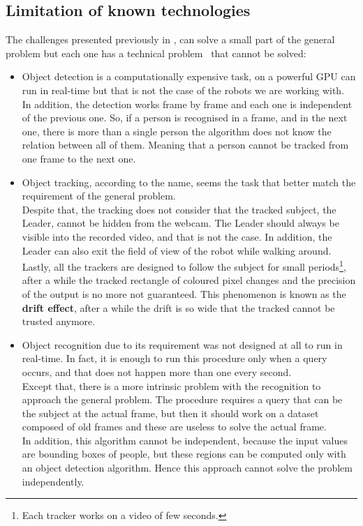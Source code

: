 \subsection{Limitation of known technologies}
The challenges presented previously in , can solve a small part of the general problem but each one has a technical problem~ that cannot be solved:
\begin{itemize}
	\item Object detection is a computationally expensive task, on a powerful GPU can run in real-time but that is not the case of the robots we are working with.\\
	In addition, the detection works frame by frame and each one is independent of the previous one. So, if a person is recognised in a frame, and in the next one, there is more than a single person the algorithm does not know the relation between all of them. Meaning that a person cannot be tracked from one frame to the next one.

	\item Object tracking, according to the name, seems the task that better match the requirement of the general problem.\\
	Despite that, the tracking does not consider that the tracked subject, the Leader, cannot be hidden from the webcam. The Leader should always be visible into the recorded video, and that is not the case. In addition, the Leader can also exit the field of view of the robot while walking around.\\
	Lastly, all the trackers are designed to follow the subject for small periods\footnote{Each tracker works on a video of few seconds.}, after a while the tracked rectangle of coloured pixel changes and the precision of the output is no more not guaranteed. This phenomenon is known as the \textbf{drift effect}, after a while the drift is so wide that the tracked cannot be trusted anymore.

	\item Object recognition due to its requirement was not designed at all to run in real-time. In fact, it is enough to run this procedure only when a query occurs, and that does not happen more than one every second.\\
	Except that, there is a more intrinsic problem with the recognition to approach the general problem. The procedure requires a query that can be the subject at the actual frame, but then it should work on a dataset composed of old frames and these are useless to solve the actual frame.\\
	In addition, this algorithm cannot be independent, because the input values are bounding boxes of people, but these regions can be computed only with an object detection algorithm. Hence this approach cannot solve the problem independently.
\end{itemize}

